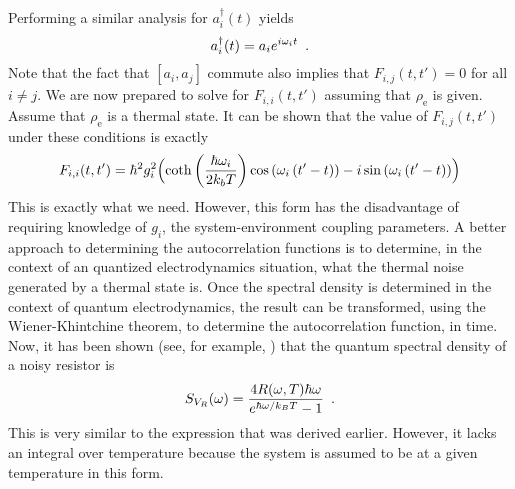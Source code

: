 \documentclass{article}
\begin{document}
Performing a similar analysis for $ a_{i}^{\dagger}(t) $ yields
\begin{equation}
   a_{i}^{\dagger}(t) = a_{i}e^{i \omega_{i}t} \enskip.
\end{equation}
Note that the fact that $ \left[ a_{i}, a_{j} \right] $ commute also implies
that $ F_{i,j}(t,t') = 0 $ for all $ i \ne j $. We are now prepared to solve for
$ F_{i,i}(t,t') $ assuming that $ \rho_{\textrm{e}} $ is given. Assume that $
\rho_{\textrm{e}} $ is a thermal state. It can be shown that the value of $
F_{i,j}(t,t') $ under these conditions is exactly
\begin{equation}
   F_{i,i}(t,t') = \hbar^2 g_{i}^{2} \Bigl(\coth\left(\frac{\hbar \omega_{i}}{2 k_{b} T}\right)
      \cos\left(\omega_{i} \left( t' -
   t \right)\right) - i \sin\left(\omega_{i} \left( t'-t \right)\right)\Bigr)
\end{equation}
This is exactly what we need. However, this form has the disadvantage of
requiring knowledge of $ g_{i} $, the system-environment coupling parameters. A
better approach to determining the autocorrelation functions is to determine, in
the context of an quantized electrodynamics situation, what the thermal noise
generated by a thermal state is. Once the spectral density is determined in the
context of quantum electrodynamics, the result can be transformed, using the
Wiener-Khintchine theorem, to determine the autocorrelation function, in time.
Now, it has been shown (see, for example, \cite{Callen1951}) that the quantum
spectral density of a noisy resistor is
\begin{equation}
   S_{V_{R}}(\omega) = \frac{4 R(\omega,T) \hbar \omega}{e^{\hbar \omega / k_{B} T
   } - 1} \enskip.
\end{equation}
This is very similar to the expression that was derived earlier. However, it
lacks an integral over temperature because the system is assumed to be at a
given temperature in this form.
\end{document}
